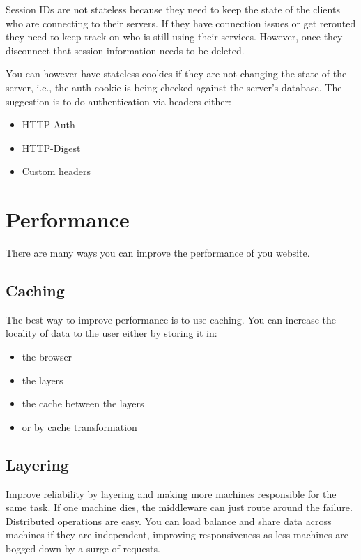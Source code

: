 \documentclass[../CMPUT-404-Notes.tex]{subfiles}
\begin{document}
Session IDs are not stateless because they need to keep the state of the clients who are connecting to their servers. If they have connection issues or get rerouted they need to keep track on who is still using their services. However, once they disconnect that session information needs to be deleted.

You can however have stateless cookies if they are not changing the state of the server, i.e., the auth cookie is being checked against the server's database.
The suggestion is to do authentication via headers either:
\begin{itemize}
  \item HTTP-Auth
  \item HTTP-Digest
  \item Custom headers
\end{itemize}

\section{Performance}
There are many ways you can improve the performance of you website.

\vspace{-5pt}
\subsection{Caching} 
The best way to improve performance is to use caching.
You can increase the locality of data to the user either by storing it in:
\begin{itemize}
  \item the browser
  \item the layers
  \item the cache between the layers
  \item or by cache transformation
\end{itemize}

\vspace{-5pt}
\subsection{Layering}
Improve reliability by layering and making more machines responsible for the same task.
If one machine dies, the middleware can just route around the failure. Distributed operations are easy.
You can load balance and share data across machines if they are independent, improving responsiveness as less machines are bogged down by a surge of requests.
\end{document}
